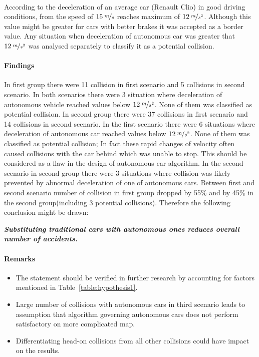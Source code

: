 \documentclass[11pt,english]{article}
\begin{document}
According to \citet{vangi2007evaluation} the deceleration of an average car (Renault Clio\textsuperscript{\textregistered}) in good driving conditions, from the speed of $15\:\nicefrac{m}{s}$ reaches maximum of $12\:\nicefrac{m}{s^2}$. Although this value might be greater for cars with better brakes it was accepted as a border value. Any situation when deceleration of autonomous car was greater that $12\:\nicefrac{m}{s^2}$ was analysed separately to classify it as a potential collision. 



\paragraph{Findings}

In first group there were 11 collision in first scenario and 5 collisions in second scenario. In both scenarios there were 3 situation where deceleration of autonomous vehicle reached values below $12\:\nicefrac{m}{s^2}$. None of them was classified as potential collision. 
In second group there were 37 collisions in first scenario and 14 collisions in second scenario. In the first scenario there were 6 situations where deceleration of autonomous car reached values below $12\:\nicefrac{m}{s^2}$. None of them was classified as potential collision; In fact these rapid changes of velocity often caused collisions with the car behind which was unable to stop. This should be considered as a flaw in the design of autonomous car algorithm. In the second scenario in second group there were 3 situations where collision was likely prevented by abnormal deceleration of one of autonomous cars. Between first and second scenario number of collision in first group dropped by 55\% and by 45\% in the second group(including 3 potential collisions). Therefore the following conclusion might be drawn:

\textbf{\textit{Substituting traditional cars with autonomous ones reduces overall number of accidents.}}



\paragraph{Remarks}

\begin{itemize}
  \item The statement should be verified in further research by accounting for factors mentioned in Table~\ref{table:hypothesis1}.
  \item Large number of collisions with autonomous cars in third scenario leads to assumption that algorithm governing autonomous cars does not perform satisfactory on more complicated map. 
  \item Differentiating head-on collisions from all other collisions could have impact on the results.
\end{itemize}
\end{document}
